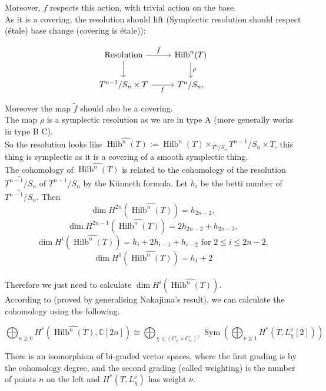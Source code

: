 \documentclass{article}
\theoremstyle{definition}
\DeclareMathOperator{\Hilb}{{\text{Hilb}}}
\DeclareMathOperator{\Sym}{{\text{Sym}}}
\begin{document}
Moreover, $f$ respects this action, with trivial action on the base.\\

As it is a covering, the resolution should lift (Symplectic resolution should respect (\'etale) base change (covering is \'etale)):

\[\begin{tikzcd}
	{\text{Resolution}} & {\Hilb^n (T)} \\
	{T^{n-1}/S_n\times T} & {T^{n}/S_n},
	\arrow["{\tilde{f}}", from=1-1, to=1-2]
	\arrow["\rho", from=1-2, to=2-2]
	\arrow[from=1-1, to=2-1]
	\arrow["f"', from=2-1, to=2-2]
\end{tikzcd}\]

Moreover the map $\tilde{f}$ should also be a covering.\\

The map $\rho$ is a symplectic resolution as we are in type A (more generally works in type B C).\\

So the resolution looks like $\widehat{\Hilb^n(T)}:=\Hilb^n(T)\times_{T^n/S_n} T^{n-1}/S_n\times T$, this thing is symplectic as it is a covering of a smooth symplectic thing.\\

The cohomology of $\widehat{\Hilb^n(T)}$ is related to the cohomology of the resolution $\widetilde{T^{n-1}/S_n}$ of $T^{n-1}/S_n$ by the K\"unneth formula. Let $h_i$ be the betti number of $\widetilde{T^{n-1}/S_n}$. Then $$\dim H^{2n}(\widehat{\Hilb^n(T)})=h_{2n-2},$$
$$\dim H^{2n-1}(\widehat{\Hilb^n(T)})=2h_{2n-2}+h_{2n-3}, $$
$$\dim H^{i}(\widehat{\Hilb^n(T)})=h_i+2h_{i-1}+h_{i-2} \text{ for } 2\leq i\leq 2n-2,$$
$$\dim H^{1}(\widehat{\Hilb^n(T)})=h_1+2$$
\\

Therefore we just need to calculate $\dim H^{i}(\widehat{\Hilb^n(T)}).$\\

According to \cite[Corollary 3]{article2} (proved by generalising Nakajima's result), we can calculate the cohomology using the following. 

$$\bigoplus_{n\geq 0}H^*(\widehat{\Hilb^n(T)},\mathbb{C}[2n])\cong \bigoplus_{\chi\in (C_n\times C_n)^\vee}\Sym(\bigoplus_{\nu\geq 1}H^*(T,L^\nu_\chi[2]))$$

There is an isomorphism of bi-graded vector spaces, where the first grading is by the cohomology degree, and the second grading (called weighting) is the number of points $n$ on the left and $H^*(T,L^\nu_\chi)$ has weight $\nu$.\\
\end{document}
